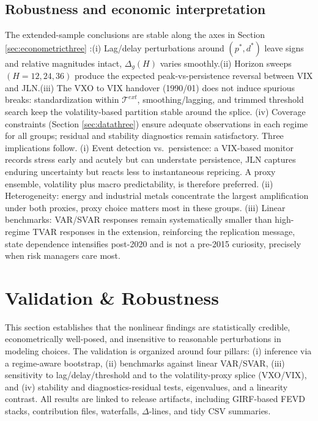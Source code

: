 \documentclass[
  11pt,
]{article}
\begin{document}
\subsection{Robustness and economic interpretation}\label{sec:extensionfive}

The extended-sample conclusions are stable along the axes in Section \ref{sec:econometricthree} :(i) Lag/delay perturbations around \((p^*, d^*)\) leave signs and relative magnitudes intact, \(\Delta_g(H)\) varies smoothly.(ii) Horizon sweeps \((H=12,24,36)\) produce the expected peak-vs-persistence reversal between VIX and JLN.(iii) The VXO to VIX handover (1990/01) does not induce spurious breaks: standardization within \(\mathcal{T}^{ext}\), smoothing/lagging, and trimmed threshold search keep the volatility-based partition stable around the splice. (iv) Coverage constraints (Section \ref{sec:datathree}) ensure adequate observations in each regime for all groups; residual and stability diagnostics remain satisfactory. Three implications follow. (i) Event detection vs.~persistence: a VIX-based monitor records stress early and acutely but can understate persistence, JLN captures enduring uncertainty but reacts less to instantaneous repricing. A proxy ensemble, volatility plus macro predictability, is therefore preferred. (ii) Heterogeneity: energy and industrial metals concentrate the largest amplification under both proxies, proxy choice matters most in these groups. (iii) Linear benchmarks: VAR/SVAR responses remain systematically smaller than high-regime TVAR responses in the extension, reinforcing the replication message, state dependence intensifies post-2020 and is not a pre-2015 curiosity, precisely when risk managers care most.

\section{Validation \& Robustness}\label{sec:validation}

This section establishes that the nonlinear findings are statistically credible, econometrically well-posed, and insensitive to reasonable perturbations in modeling choices. The validation is organized around four pillars: (i) inference via a regime-aware bootstrap, (ii) benchmarks against linear VAR/SVAR, (iii) sensitivity to lag/delay/threshold and to the volatility-proxy splice (VXO/VIX), and (iv) stability and diagnostics-residual tests, eigenvalues, and a linearity contrast. All results are linked to release artifacts, including GIRF-based FEVD stacks, contribution files, waterfalls, \(\Delta\)-lines, and tidy CSV summaries.
\end{document}
